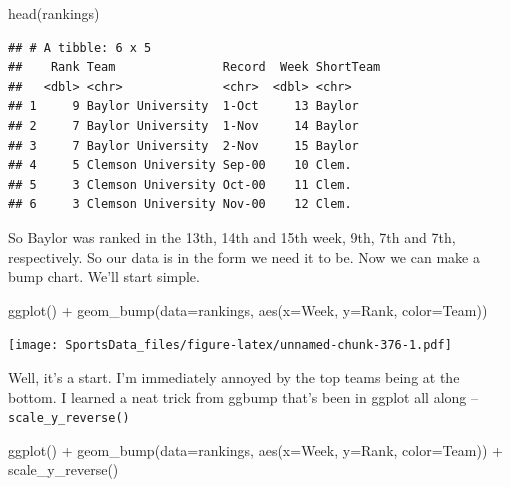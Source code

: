 \documentclass[
]{book}
\newenvironment{Shaded}{\begin{snugshade}}{\end{snugshade}}
\newcommand{\AttributeTok}[1]{\textcolor[rgb]{0.77,0.63,0.00}{#1}}
\newcommand{\FunctionTok}[1]{\textcolor[rgb]{0.00,0.00,0.00}{#1}}
\newcommand{\NormalTok}[1]{#1}
\newcommand{\SpecialCharTok}[1]{\textcolor[rgb]{0.00,0.00,0.00}{#1}}
\begin{document}
\begin{Shaded}
\begin{Highlighting}[]
\FunctionTok{head}\NormalTok{(rankings)}
\end{Highlighting}
\end{Shaded}

\begin{verbatim}
## # A tibble: 6 x 5
##    Rank Team               Record  Week ShortTeam
##   <dbl> <chr>              <chr>  <dbl> <chr>    
## 1     9 Baylor University  1-Oct     13 Baylor   
## 2     7 Baylor University  1-Nov     14 Baylor   
## 3     7 Baylor University  2-Nov     15 Baylor   
## 4     5 Clemson University Sep-00    10 Clem.    
## 5     3 Clemson University Oct-00    11 Clem.    
## 6     3 Clemson University Nov-00    12 Clem.
\end{verbatim}

So Baylor was ranked in the 13th, 14th and 15th week, 9th, 7th and 7th, respectively. So our data is in the form we need it to be. Now we can make a bump chart. We'll start simple.

\begin{Shaded}
\begin{Highlighting}[]
\FunctionTok{ggplot}\NormalTok{() }\SpecialCharTok{+} \FunctionTok{geom\_bump}\NormalTok{(}\AttributeTok{data=}\NormalTok{rankings, }\FunctionTok{aes}\NormalTok{(}\AttributeTok{x=}\NormalTok{Week, }\AttributeTok{y=}\NormalTok{Rank, }\AttributeTok{color=}\NormalTok{Team))}
\end{Highlighting}
\end{Shaded}

\texttt{[image: SportsData\_files/figure-latex/unnamed-chunk-376-1.pdf]}

Well, it's a start. I'm immediately annoyed by the top teams being at the bottom. I learned a neat trick from ggbump that's been in ggplot all along -- \texttt{scale\_y\_reverse()}

\begin{Shaded}
\begin{Highlighting}[]
\FunctionTok{ggplot}\NormalTok{() }\SpecialCharTok{+} \FunctionTok{geom\_bump}\NormalTok{(}\AttributeTok{data=}\NormalTok{rankings, }\FunctionTok{aes}\NormalTok{(}\AttributeTok{x=}\NormalTok{Week, }\AttributeTok{y=}\NormalTok{Rank, }\AttributeTok{color=}\NormalTok{Team)) }\SpecialCharTok{+} \FunctionTok{scale\_y\_reverse}\NormalTok{()}
\end{Highlighting}
\end{Shaded}
\end{document}
